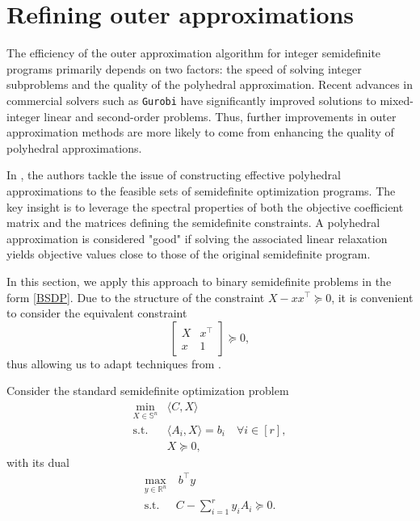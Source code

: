 \documentclass{article}
\begin{document}
\section{Refining outer approximations}\label{oa_sec:3}


The efficiency of the outer approximation algorithm for integer semidefinite programs primarily depends on two factors: the speed of solving integer subproblems and the quality of the polyhedral approximation. Recent advances in commercial solvers such as \texttt{Gurobi} have significantly improved solutions to mixed-integer linear and second-order problems. Thus, further improvements in outer approximation methods are more likely to come from enhancing the quality of polyhedral approximations.

In \cite{de2023instance}, the authors tackle the issue of constructing effective polyhedral approximations to the feasible sets of semidefinite optimization programs. The key insight is to leverage the spectral properties of both the objective coefficient matrix and the matrices defining the semidefinite constraints. A polyhedral approximation is considered "good" if solving the associated linear relaxation yields objective values close to those of the original semidefinite program.

In this section, we apply this approach to binary semidefinite problems in the form \eqref{BSDP}. Due to the structure of the constraint $X - xx^\top \succeq 0$, it is convenient to consider the equivalent constraint
\[
\begin{bmatrix} X & x^\top \\ x & 1 \end{bmatrix}\succeq 0,
\]
thus allowing us to adapt techniques from \cite{de2023instance}.

Consider the standard semidefinite optimization problem
\begin{equation}
\begin{aligned}
\min_{X\in \mathbb{S}^{ n}} & \langle C,X\rangle \quad \\
\text{s.t. } & \langle A_i,X \rangle = b_i \quad \forall i \in [r], \\
& X \succeq 0, 
\end{aligned}
\end{equation}
with its dual
\begin{equation}
\begin{aligned}
\max_{y\in \mathbb{R}^{n}} & \ b^\top y \\
\text{s.t. } & C - \sum_{i=1}^r y_i A_i \succeq 0.
\end{aligned}
\end{equation}
\end{document}
